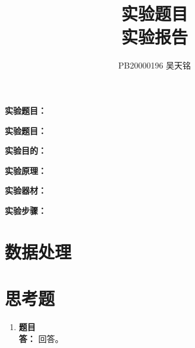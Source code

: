 \documentclass[fontsize=12pt]{article}
\title{实验题目\\\Large{实验报告}}
\author{PB20000196 吴天铭}
\begin{document}
  \maketitle

  \begin{labeling}{\textbf{实验题目：}}
    \item[\textbf{实验题目：}]
    \item[\textbf{实验目的：}]
    \item[\textbf{实验原理：}]
    \item[\textbf{实验器材：}]
    \item[\textbf{实验步骤：}]
  \end{labeling}

  \section*{数据处理}

  \section*{思考题}
  \begin{enumerate}
    \item \textbf{题目} \\
      \textbf{答：} 回答。
  \end{enumerate}
\end{document}
